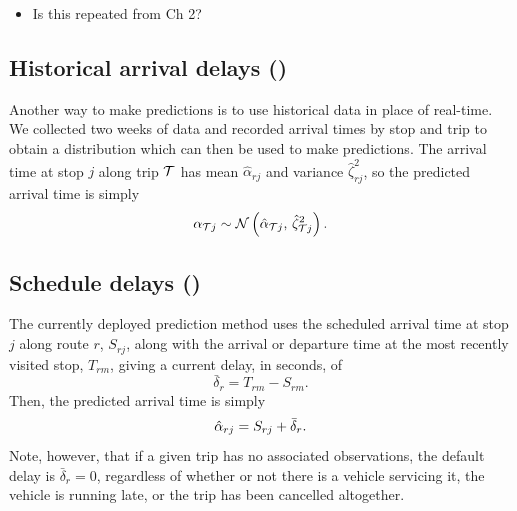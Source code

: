 \begin{itemize}
\item Is this repeated from Ch 2?
\end{itemize}





\subsection{Historical arrival delays (\Fhist{})}
\label{eq:prediction_arrival_historical}

Another way to make predictions is to use historical data in place of real-time. We collected two weeks of data and recorded arrival times by stop and trip to obtain a distribution which can then be used to make predictions. The arrival time at stop $j$ along trip $\mathcal{T}$ has mean $\hat\alpha_{rj}$ and variance $\hat\zeta_{rj}^2$, so the predicted arrival time is simply
\begin{equation}
\label{eq:arrival_pred_historical}
\alpha_{\mathcal{T} j} \sim \mathcal{N}\left(\hat\alpha_{\mathcal{T} j},\, \hat\zeta_{\mathcal{T} j}^2\right).
\end{equation}


\subsection{Schedule delays (\Fsched{})}
\label{eq:prediction_arrival_sched_delay}

The currently deployed prediction method uses the scheduled arrival time at stop $j$ along route $r$, $S_{rj}$, along with the arrival or departure time at the most recently visited stop, $T_{rm}$, giving a current delay, in seconds, of
\begin{equation}
\label{eq:sched_cur_delay}
\bar\delta_{r} = T_{rm} - S_{rm}.
\end{equation}
Then, the predicted arrival time is simply
\begin{equation}
\label{eq:sched_pred_arr}
\hat{\alpha}_{rj} = S_{rj} + \bar\delta_r.
\end{equation}
Note, however, that if a given trip has no associated observations, the default delay is $\bar\delta_r = 0$, regardless of whether or not there is a vehicle servicing it, the vehicle is running late, or the trip has been cancelled altogether.
